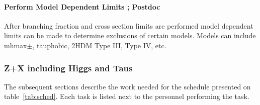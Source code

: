 \documentclass[11pt]{article}
\newcommand{\tanb}{$\tan \beta$}
\begin{document}
\paragraph{Perform Model Dependent Limits ;  Postdoc} %
After branching fraction and cross section limits are performed model dependent limits can be made to determine exclusions of certain models.  Models can include mhmax$\pm$, tauphobic, 2HDM Type III, Type IV, etc.  


\subsubsection{Z+X including Higgs and Taus}
The subsequent sections describe the work needed for the schedule presented on table~\ref{tab:sched}. Each task is listed next to the personnel performing the task.
\end{document}
